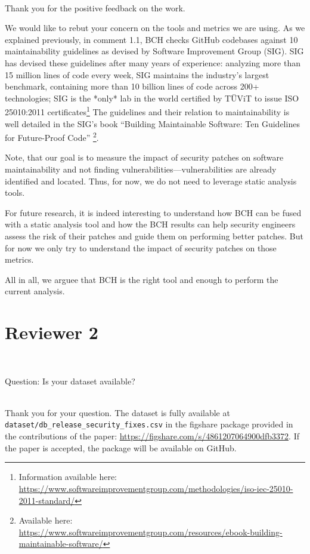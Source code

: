 \documentclass[11pt,fleqn]{article}
\newcommand{\eline}{\vspace*{.75\baselineskip}}
\newcommand{\Referee}[1]{\eline \noindent {\bf Reviewer comment #1:} \\}
\newcommand{\Us}{\eline \noindent {\bf Response:}\\}
\newcommand{\newreviewer}[1]{\section*{Reviewer #1}\vspace*{-1.05\baselineskip}}
\newenvironment{revcomment}[1][]
{\Referee{#1}\begin{rcomment}}
{\end{rcomment}}
\begin{document}
\Us Thank you for the positive feedback on the work. 

We would like to rebut your concern on the tools and 
metrics we are using. As we explained previously, in comment 1.1, 
BCH checks GitHub codebases against 10 maintainability guidelines 
as devised by Software Improvement Group (SIG). SIG has devised 
these guidelines after many years of experience: analyzing more 
than 15 million lines of code every week, SIG maintains the industry’s largest 
benchmark, containing more than 10 billion lines of code across 200+ technologies; SIG 
is the *only* lab in the world certified by TÜViT to issue ISO 25010:2011 
certificates\footnote{Information available here: 
\url{https://www.softwareimprovementgroup.com/methodologies/iso-iec-25010-2011-standard/}}
The guidelines and their relation to maintainability is well 
detailed in the SIG's book ``Building Maintainable 
Software: Ten Guidelines for Future-Proof Code''
\footnote{Available here: \url{https://www.softwareimprovementgroup.com/resources/ebook-building-maintainable-software/}}.

Note, that our goal is to measure the impact of security patches on software 
maintainability and not finding vulnerabilities---vulnerabilities
are already identified and located. Thus, for now, 
we do not need to leverage static analysis tools. 

For future research, it is indeed interesting to 
understand how BCH can be fused with a static analysis tool 
and how the BCH results can help 
security engineers assess the risk of their patches and guide 
them on performing better patches. But for now we only try
to understand the impact of security patches on those metrics.

All in all, we arguee that BCH is the right tool and enough
to perform the current analysis.

\newreviewer{2}

\begin{revcomment}[2.1]

    Question:  Is your dataset available?

\end{revcomment}

\Us Thank you for your question. The dataset is fully available at 
\texttt{dataset/db\_release\_security\_fixes.csv} in the figshare package
provided in the contributions of the paper: 
\url{https://figshare.com/s/4861207064900dfb3372}. If the paper is 
accepted, the package will be available on GitHub.
\end{document}
